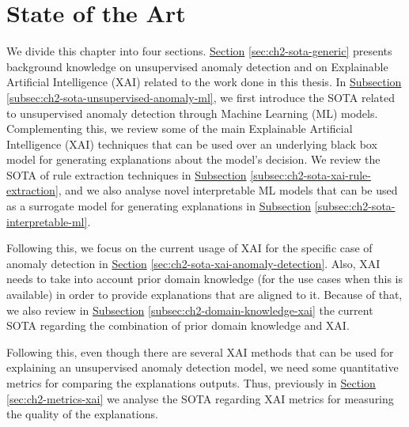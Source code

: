 \chapter{State of the Art}\label{ch:sota}

We divide this chapter into four sections. \hyperref[sec:ch2-sota-generic]{Section} \ref{sec:ch2-sota-generic} presents background knowledge on unsupervised anomaly detection and on Explainable Artificial Intelligence (XAI) related to the work done in this thesis. In \hyperref[subsec:ch2-sota-unsupervised-anomaly-ml]{Subsection} \ref{subsec:ch2-sota-unsupervised-anomaly-ml}, we first introduce the SOTA related to unsupervised anomaly detection through Machine Learning (ML) models. Complementing this, we review some of the main Explainable Artificial Intelligence (XAI) techniques that can be used over an underlying black box model for generating explanations about the model's decision. We review the SOTA of rule extraction techniques in \hyperref[subsec:ch2-sota-xai-rule-extraction]{Subsection} \ref{subsec:ch2-sota-xai-rule-extraction}, and we also analyse novel interpretable ML models that can be used as a surrogate model for generating explanations in \hyperref[subsec:ch2-sota-interpretable-ml]{Subsection} \ref{subsec:ch2-sota-interpretable-ml}. 

Following this, we focus on the current usage of XAI for the specific case of anomaly detection in \hyperref[sec:ch2-sota-xai-anomaly-detection]{Section} \ref{sec:ch2-sota-xai-anomaly-detection}. Also, XAI needs to take into account prior domain knowledge (for the use cases when this is available) in order to provide explanations that are aligned to it. Because of that, we also review in \hyperref[subsec:ch2-domain-knowledge-xai]{Subsection} \ref{subsec:ch2-domain-knowledge-xai} the current SOTA regarding the combination of prior domain knowledge and XAI.

Following this, even though there are several XAI methods that can be used for explaining an unsupervised anomaly detection model, we need some quantitative metrics for comparing the explanations outputs. Thus, previously in \hyperref[sec:ch2-metrics-xai]{Section} \ref{sec:ch2-metrics-xai} we analyse the SOTA regarding XAI metrics for measuring the quality of the explanations. 

